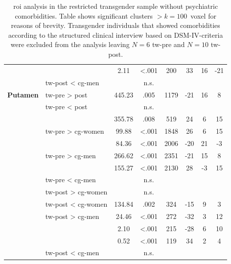 \documentclass{article}
\begin{document}
\begin{table}[ht]
\begin{center}
\begin{tabular}{rl|S[table-format=3.2]S[table-format=<0.3, add-integer-zero=false]S[table-format=4.0]S[table-format=+2.0]S[table-format=+2.0]S[table-format=+2.0]}
                &                              & 2.11   & \textless{}.001 & 200  & 33  & 16  & -21 \\
                & \ac{tw}-post < \ac{cg}-men & & {n.s.} \\ 
                \textbf{Putamen} & \ac{tw}-pre > post           & 445.23 & .005            & 1179 & -21 & 16  & 8   \\
                & \ac{tw}-pre < post & & {n.s.} \\
                &                              & 355.78 & .008            & 519  & 24  & 6   & 15  \\
                & \ac{tw}-pre > \ac{cg}-women  & 99.88  & \textless{}.001 & 1848 & 26  & 6   & 15  \\
                &                              & 84.36  & \textless{}.001 & 2006 & -20 & 21  & -3  \\
                & \ac{tw}-pre > \ac{cg}-men    & 266.62 & \textless{}.001 & 2351 & -21 & 15  & 8   \\
                &                              & 155.27 & \textless{}.001 & 2130 & 28  & -3  & 15  \\
                & \ac{tw}-pre < \ac{cg}-men & & {n.s.} \\
                & \ac{tw}-post > \ac{cg}-women & & {n.s.} \\
                & \ac{tw}-post < \ac{cg}-women & 134.84 & .002            & 324  & -15 & 9   & 3   \\
                & \ac{tw}-post > \ac{cg}-men   & 24.46  & \textless{}.001 & 272  & -32 & 3   & 12  \\
                &                              & 2.10   & \textless{}.001 & 215  & -28 & 6   & 10  \\
                &                              & 0.52   & \textless{}.001 & 119  & 34  & 2   & 4   \\
                & \ac{tw}-post < \ac{cg}-men & & {n.s.} \\


            \end{tabular}
        \end{center}
        \caption[ROI analysis in the restricted transgender sample without psychiatric comorbidities]{\ac{roi} analysis in the restricted transgender sample without psychiatric comorbidities. Table shows significant clusters $> k = 100$~voxel for reasons of brevity. Transgender individuals that showed comorbidities according to the structured clinical interview based on DSM-IV-criteria were excluded from the analysis leaving $N = 6$ \ac{tw}-pre and $N = 10$ \ac{tw}-post. \\

}
\end{table}
\end{document}
